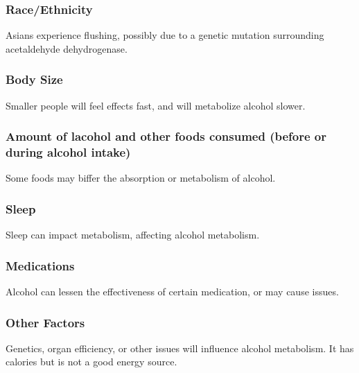 \documentclass[letterpaper, 11pt]{article}
\begin{document}
\subsubsection{Race/Ethnicity}
\label{sec:org4b2e48d}
Asians experience flushing, possibly due to a genetic mutation surrounding acetaldehyde dehydrogenase.\\
\subsubsection{Body Size}
\label{sec:orge78a46c}
Smaller people will feel effects fast, and will metabolize alcohol slower.\\
\subsubsection{Amount of lacohol and other foods consumed (before or during alcohol intake)}
\label{sec:orgd39cca2}
Some foods may biffer the absorption or metabolism of alcohol.\\
\subsubsection{Sleep}
\label{sec:orgb09a775}
Sleep can impact metabolism, affecting alcohol metabolism.\\
\subsubsection{Medications}
\label{sec:orgc8e33c7}
Alcohol can lessen the effectiveness of certain medication, or may cause issues.\\
\subsubsection{Other Factors}
\label{sec:org1d56f2d}
Genetics, organ efficiency, or other issues will influence alcohol metabolism. It has calories but is not a good energy source.\\
\end{document}
